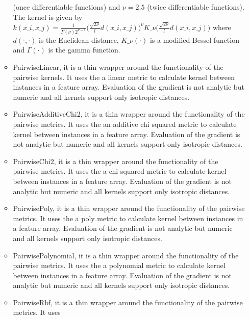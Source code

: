 \begin{itemize}
\begin{itemize}
      (once differentiable functions) and $\nu = 2.5$ (twice differentiable functions).
      The kernel is given by $k(x\_i, x\_j) =  \frac{1}{\Gamma(\nu)2^{\nu-1}}\Bigg(
      \frac{\sqrt{2\nu}}{l} d(x\_i , x\_j ) \Bigg)^\nu K\_\nu\Bigg( \frac{\sqrt{2\nu}}{l} d(x\_i , x\_j
      )\Bigg)$                                                                  where
      $d(\cdot,\cdot)$ is the Euclidean distance, $K\_{\nu}(\cdot)$ is a modified Bessel function and
      $\Gamma(\cdot)$ is the gamma function.
      \item PairwiseLinear, it is a thin wrapper around the functionality of the pairwise kernels.
      It uses the a linear metric to calculate kernel between instances
      in a feature array. Evaluation of the gradient is not analytic but numeric and all kernels
      support only isotropic distances.                                                    \item
      PairwiseAdditiveChi2, it is a thin wrapper around the functionality of the pairwise metrics.
      It uses the an additive chi squared metric to calculate kernel between instances
      in a feature array. Evaluation of the gradient is not analytic but numeric and all kernels
      support only isotropic distances.                                                    \item
      PairwiseChi2, it is a thin wrapper around the functionality of the pairwise metrics. It uses
      the a chi squared metric to calculate kernel between instances
      in a feature array. Evaluation of the gradient is not analytic but numeric and all kernels
      support only isotropic distances.                                                    \item
      PairwisePoly, it is a thin wrapper around the functionality of the pairwise metrics. It uses
      the a poly metric to calculate kernel between instances
      in a feature array. Evaluation of the gradient is not analytic but numeric and all kernels
      support only isotropic distances.                                                    \item
      PairwisePolynomial, it is a thin wrapper around the functionality of the pairwise metrics. It
      uses the a polynomial metric to calculate kernel between instances
      in a feature array. Evaluation of the gradient is not analytic but numeric and all kernels
      support only isotropic distances.                                                    \item
      PairwiseRbf, it is a thin wrapper around the functionality of the pairwise metrics. It uses

\end{itemize}
\end{itemize}
